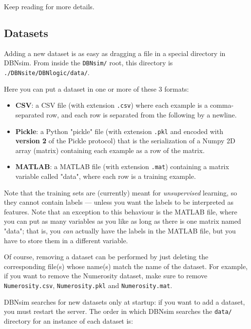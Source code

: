 \documentclass[a4paper]{article}
\begin{document}
		
Keep reading for more details.

		
	\subsection{Datasets}

		
Adding a new dataset is as easy as dragging a file in a special directory in DBNsim. From inside the \texttt{DBNsim/} root, this directory is \texttt{./DBNsite/DBNlogic/data/}.
		
Here you can put a dataset in one or more of these 3 formats:
		
	\begin{itemize}
		
			
	\item \textbf{CSV}: a CSV file (with extension \texttt{.csv}) where each example is a comma-separated row, and each row is separated from the following by a newline.
			
	\item \textbf{Pickle}: a Python "pickle" file (with extension \texttt{.pkl} and encoded with \textbf{version 2} of the Pickle protocol) that is the serialization of a Numpy 2D array (matrix) containing each example as a row of the matrix.
			
	\item \textbf{MATLAB}: a MATLAB file (with extension \texttt{.mat}) containing a matrix variable called "data", where each row is a training example.
		
	\end{itemize}

		
Note that the training sets are (currently) meant for \emph{unsupervised} learning, so they cannot contain labels --- unless you want the labels to be interpreted as features. Note that an exception to this behaviour is the MATLAB file, where you can put as many variables as you like as long as there is one matrix named "data"; that is, you \emph{can} actually have the labels in the MATLAB file, but you have to store them in a different variable.
		
Of course, removing a dataset can be performed by just deleting the corresponding file(s) whose name(s) match the name of the dataset. For example, if you want to remove the Numerosity dataset, make sure to remove \texttt{Numerosity.csv}, \texttt{Numerosity.pkl} and \texttt{Numerosity.mat}.
		
DBNsim searches for new datasets only at startup: if you want to add a dataset, you must restart the server. The order in which DBNsim searches the \texttt{data/} directory for an instance of each dataset is:
		
\end{document}
